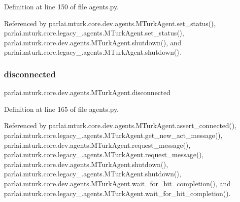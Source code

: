 Definition at line 150 of file agents.\+py.



Referenced by parlai.\+mturk.\+core.\+dev.\+agents.\+M\+Turk\+Agent.\+set\+\_\+status(), parlai.\+mturk.\+core.\+legacy\+\_.\+agents.\+M\+Turk\+Agent.\+set\+\_\+status(), parlai.\+mturk.\+core.\+dev.\+agents.\+M\+Turk\+Agent.\+shutdown(), and parlai.\+mturk.\+core.\+legacy\+\_.\+agents.\+M\+Turk\+Agent.\+shutdown().

\mbox{\label{classparlai_1_1mturk_1_1core_1_1dev_1_1agents_1_1MTurkAgent_a43da2ba6e4a76586bf94e738ad1f168d}} 
\subsubsection{\texorpdfstring{disconnected}{disconnected}}
{\footnotesize\ttfamily parlai.\+mturk.\+core.\+dev.\+agents.\+M\+Turk\+Agent.\+disconnected}



Definition at line 165 of file agents.\+py.



Referenced by parlai.\+mturk.\+core.\+dev.\+agents.\+M\+Turk\+Agent.\+assert\+\_\+connected(), parlai.\+mturk.\+core.\+legacy\+\_.\+agents.\+M\+Turk\+Agent.\+get\+\_\+new\+\_\+act\+\_\+message(), parlai.\+mturk.\+core.\+dev.\+agents.\+M\+Turk\+Agent.\+request\+\_\+message(), parlai.\+mturk.\+core.\+legacy\+\_.\+agents.\+M\+Turk\+Agent.\+request\+\_\+message(), parlai.\+mturk.\+core.\+dev.\+agents.\+M\+Turk\+Agent.\+shutdown(), parlai.\+mturk.\+core.\+legacy\+\_.\+agents.\+M\+Turk\+Agent.\+shutdown(), parlai.\+mturk.\+core.\+dev.\+agents.\+M\+Turk\+Agent.\+wait\+\_\+for\+\_\+hit\+\_\+completion(), and parlai.\+mturk.\+core.\+legacy\+\_.\+agents.\+M\+Turk\+Agent.\+wait\+\_\+for\+\_\+hit\+\_\+completion().

\mbox{\label{classparlai_1_1mturk_1_1core_1_1dev_1_1agents_1_1MTurkAgent_a2fe8f89ab693d56a6640138b4133132a}} 
